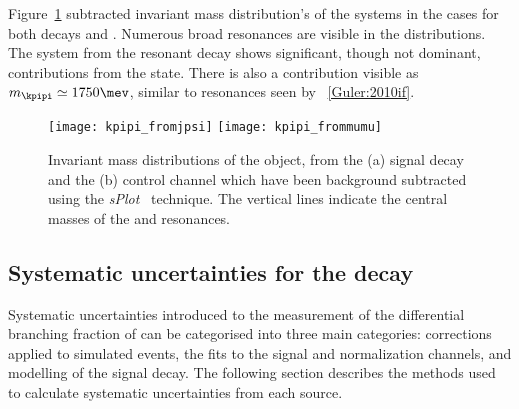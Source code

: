 Figure~\ref{fig:kpipi:kpipi} subtracted invariant mass distribution's of the \kpipi systems in the
cases for both decays \btojpsikpipi and \btokpipimumu.
Numerous broad resonances are visible in the distributions.
The \kpipi system from the resonant \btojpsikpipi decay shows significant, though not dominant,
contributions from the  state.
There is also a contribution visible as $m_\kpipi\simeq1750\mev$, similar to resonances seen by
\belle~\ref{Guler:2010if}.



%
%

\begin{figure}
  \begin{center}
    \texttt{[image: kpipi\_fromjpsi]}
    \texttt{[image: kpipi\_frommumu]}
    \caption[Invariant mass distributions of \kpipi]
    {\small
      Invariant mass distributions of the \kpipi object, from the
      (a) signal decay \btokpipimumu and the
      (b) control channel \btojpsikpipi which have been background subtracted
      using the \emph{sPlot}~\cite{splot} technique.
      The vertical lines indicate the central masses of the  and 
      resonances.
    }
    \label{fig:kpipi:kpipi}
  \end{center}
\end{figure}



\subsection[Systematic uncertainties for the decay \btokpipimumu]
{Systematic uncertainties for the decay \tmath{\btokpipimumu}}
\label{ssec:kpipi:syst}

Systematic uncertainties introduced to the measurement of the differential branching fraction of
\btokpipimumu can be categorised into three main categories:
corrections applied to simulated events,
the fits to the signal and normalization channels, and
modelling of the signal decay.
The following section describes the methods used to calculate systematic uncertainties from each
source.

